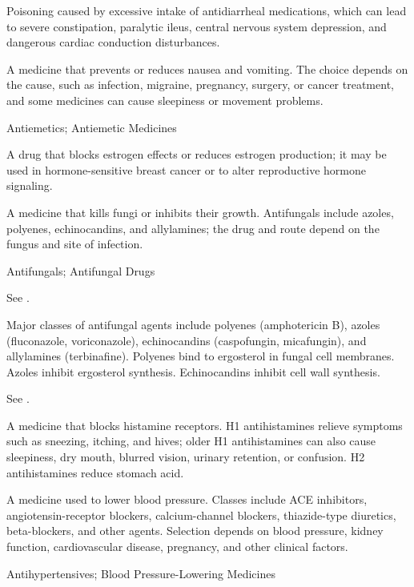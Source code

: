  Poisoning caused by excessive intake of antidiarrheal medications, which can lead to severe constipation, paralytic ileus, central nervous system depression, and dangerous cardiac conduction disturbances.

 A medicine that prevents or reduces nausea and vomiting. The choice depends on the cause, such as infection, migraine, pregnancy, surgery, or cancer treatment, and some medicines can cause sleepiness or movement problems.

\synonyms
Antiemetics; Antiemetic Medicines

 A drug that blocks estrogen effects or reduces estrogen production; it may be used in hormone-sensitive breast cancer or to alter reproductive hormone signaling.

 A medicine that kills fungi or inhibits their growth. Antifungals include azoles, polyenes, echinocandins, and allylamines; the drug and route depend on the fungus and site of infection.

\synonyms
Antifungals; Antifungal Drugs

 See .

 Major classes of antifungal agents include polyenes (amphotericin B), azoles
(fluconazole, voriconazole), echinocandins (caspofungin, micafungin), and allylamines
(terbinafine). Polyenes bind to ergosterol in fungal cell membranes. Azoles inhibit
ergosterol synthesis. Echinocandins inhibit cell wall synthesis.

 See .

 A medicine that blocks histamine receptors. H1 antihistamines relieve symptoms such as sneezing, itching, and hives; older H1 antihistamines can also cause sleepiness, dry mouth, blurred vision, urinary retention, or confusion. H2 antihistamines reduce stomach acid.

 A medicine used to lower blood pressure. Classes include ACE inhibitors, angiotensin-receptor blockers, calcium-channel blockers, thiazide-type diuretics, beta-blockers, and other agents. Selection depends on blood pressure, kidney function, cardiovascular disease, pregnancy, and other clinical factors.

\synonyms
Antihypertensives; Blood Pressure-Lowering Medicines

